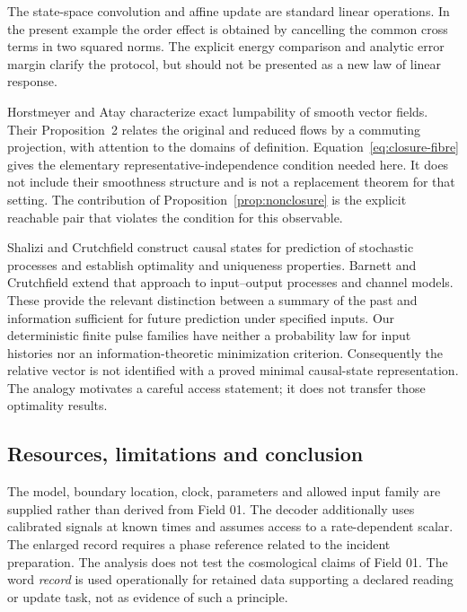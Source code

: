 \documentclass[11pt,a4paper]{article}
\theoremstyle{remark}
\begin{document}
The state-space convolution and affine update are standard linear
operations\cite{frazzoli}. In the present example the order effect is
obtained by cancelling the common cross terms in two squared norms.
The explicit energy comparison and analytic error margin clarify the
protocol, but should not be presented as a new law of linear response.

Horstmeyer and Atay characterize exact lumpability of smooth vector
fields\cite{horstmeyer}. Their Proposition~2 relates the original and
reduced flows by a commuting projection, with attention to the domains
of definition. Equation~\eqref{eq:closure-fibre} gives the elementary
representative-independence condition needed here. It does not include
their smoothness structure and is not a replacement theorem for that
setting. The contribution of Proposition~\ref{prop:nonclosure} is the
explicit reachable pair that violates the condition for this observable.

Shalizi and Crutchfield construct causal states for prediction of
stochastic processes and establish optimality and uniqueness
properties\cite{shalizi}. Barnett and Crutchfield extend that approach
to input--output processes and channel models\cite[Sections VI and IX]{barnett}.
These provide the relevant distinction between a summary of the past
and information sufficient for future prediction under specified inputs.
Our deterministic finite pulse families have neither a probability law
for input histories nor an information-theoretic minimization criterion.
Consequently the relative vector is not identified with a proved minimal
causal-state representation. The analogy motivates a careful access
statement; it does not transfer those optimality results.

\subsection{Resources, limitations and conclusion}

The model, boundary location, clock, parameters and allowed input family
are supplied rather than derived from Field 01. The decoder additionally
uses calibrated signals at known times and assumes access to a
rate-dependent scalar. The enlarged record requires a phase reference
related to the incident preparation. The analysis does not test the
cosmological claims of Field 01. The word \emph{record} is used
operationally for retained data supporting a declared reading or update
task, not as evidence of such a principle.
\end{document}
